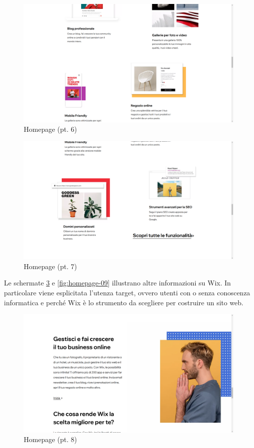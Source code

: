 \documentclass[11pt,a4paper]{article}
\newcommand*{\wix}{Wix}
\begin{document}
\begin{figure}[H]
  \centering
  \includegraphics[width=1\textwidth]{img/homepage-06.png}
  \caption{Homepage (pt. 6)}
  \label{fig:homepage-06}
\end{figure}

\begin{figure}[H]
  \centering
  \includegraphics[width=1\textwidth]{img/homepage-07.png}
  \caption{Homepage (pt. 7)}
  \label{fig:homepage-07}
\end{figure}

Le schermate \ref{fig:homepage-08} e \ref{fig:homepage-09} illustrano
altre informazioni su \wix{}. In particolare viene esplicitata
l'utenza target, ovvero utenti con o senza conoscenza informatica e
perché \wix{} è lo strumento da scegliere per costruire un sito web.

\begin{figure}[H]
  \centering
  \includegraphics[width=1\textwidth]{img/homepage-08.png}
  \caption{Homepage (pt. 8)}
  \label{fig:homepage-08}
\end{figure}
\end{document}
